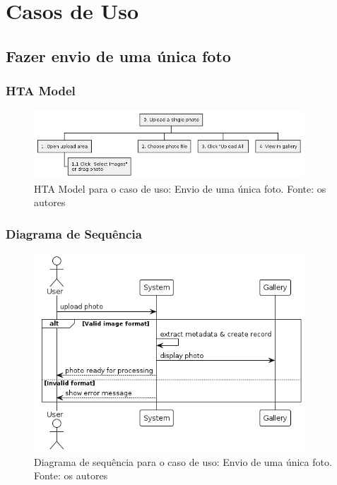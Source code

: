 \chapter{Casos de Uso}

\section{Fazer envio de uma única foto}

\subsection{HTA Model}

\begin{figure}[H]
    \centering
    \includegraphics[width=0.9\textwidth]{../figures/hta/UC001.png}
    \caption{HTA Model para o caso de uso: Envio de uma única foto. Fonte: os autores}
    \label{fig:hta-uc001}
\end{figure}

\subsection{Diagrama de Sequência}

\begin{figure}[H]
    \centering
    \includegraphics[width=0.9\textwidth]{../figures/dss/UC001.png}
    \caption{Diagrama de sequência para o caso de uso: Envio de uma única foto. Fonte: os autores}
    \label{fig:dss-uc001}
\end{figure}

